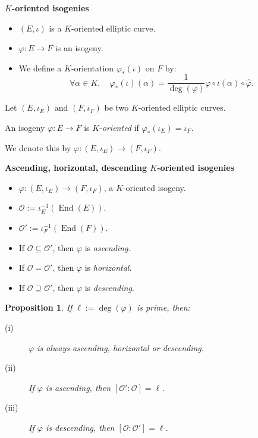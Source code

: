 \documentclass[10pt]{beamer}
\theoremstyle{plain}
\newtheorem{proposition}{Proposition}
\theoremstyle{definition}
\newcommand{\mO}{\mathcal{O}}
\renewcommand{\(}{\left(}
\renewcommand{\)}{\right)}
\DeclareMathOperator{\End}{End}
\begin{document}
\begin{frame}
\textbf{$K$-oriented isogenies}

\vspace{0.5cm}

\begin{itemize}
\item $(E, \iota)$ is a $K$-oriented elliptic curve. 
\item $\varphi : E\longrightarrow F$ is an isogeny.
\item We define a $K$-orientation $\varphi_*(\iota)$ on $F$ by:
\[\forall \alpha\in K,  \quad \varphi_*(\iota)(\alpha)=\frac{1}{\deg(\varphi)}\varphi\circ \iota(\alpha)\circ \widehat{\varphi}.\]
\end{itemize}

\begin{definition}
Let $(E, \iota_E)$ and $(F,\iota_F)$ be two $K$-oriented elliptic curves.  

An isogeny $\varphi : E\longrightarrow F$ is $K$-\emph{oriented} if $\varphi_*(\iota_E)=\iota_F$.  

We denote this by $\varphi : (E, \iota_E)\longrightarrow(F,\iota_F)$.
\end{definition}

\end{frame}

\begin{frame}
\textbf{Ascending, horizontal, descending $K$-oriented isogenies}

\vspace{0.5cm}

\begin{itemize}
\item $\varphi : (E, \iota_E)\longrightarrow(F,\iota_F)$, a $K$-oriented isogeny.
\item $\mO:=\iota_E^{-1}(\End(E))$.
\item $\mO':=\iota_F^{-1}(\End(F))$.

\pause
\item If $\mO\subseteq\mO'$, then $\varphi$ is \emph{ascending}.
\item If $\mO=\mO'$, then $\varphi$ is \emph{horizontal}.
\item If $\mO\supseteq\mO'$, then $\varphi$ is \emph{descending}.
\end{itemize}

\pause

\begin{proposition}
If $\ell:=\deg(\varphi)$ is prime, then: 
\begin{description}
\item[(i)] $\varphi$ is always ascending, horizontal or descending.
\item[(ii)] If $\varphi$ is ascending, then $[\mO':\mO]=\ell$.
\item[(iii)] If $\varphi$ is descending, then $[\mO:\mO']=\ell$.
\end{description}

\end{proposition}

\end{frame}
\end{document}
